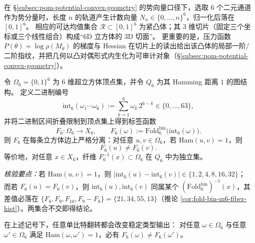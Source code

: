 \begin{enumerate}
  \begin{proposition}
  \label{prop:terminal-6d-reachable-mean-convex-body}
  在 \S\ref{subsec:pom-potential-convex-geometry} 的势向量口径下，选取 \(6\) 个二元通道作为势分量时，长度 \(n\) 的轨道产生计数向量
  \(N_n\in\{0,\dots,n\}^6\)，归一化后落在 \([0,1]^6\)。
  相应的可达均值集合 \(\mathcal{R}\subset[0,1]^6\) 为紧凸体；其 \(3\) 维切片（固定三个坐标或三个线性组合）构成“6D 立方体的 3D 切面”。
  更重要的是，压力函数 \(P(\theta)=\log\rho(M_\theta)\) 的梯度与 Hessian 在切片上的读出给出该凸体的局部一阶/二阶指纹，并把几何以凸对偶形式内生化为可审计对象（\S\ref{subsec:pom-potential-convex-geometry}）。
  \end{proposition}

  \begin{theorem}\label{thm:terminal-foldbin6-cube-edge-separation}
  令 \(\Omega_6=\{0,1\}^6\) 为 \(6\) 维超立方体顶点集，并令 \(Q_6\) 为其 Hamming 距离 \(1\) 的图结构。
  定义二进制编号
  \[
  \mathrm{int}_6(\omega_1\cdots\omega_6):=\sum_{k=1}^6 \omega_k\,2^{6-k}\in\{0,\dots,63\},
  \]
  并将二进制区间折叠限制到顶点集上得到标签函数
  \[
  F_6:\Omega_6\to X_6,\qquad F_6(\omega):=\mathrm{Fold}^{\mathrm{bin}}_6\bigl(\mathrm{int}_6(\omega)\bigr).
  \]
  则 \(F_6\) 在每条立方体边上严格分离：对任意 \(u,v\in\Omega_6\)，若 \(\mathrm{Ham}(u,v)=1\)，则
  \[
  F_6(u)\neq F_6(v).
  \]
  等价地，对任意 \(x\in X_6\)，纤维 \(F_6^{-1}(x)\subset\Omega_6\) 在 \(Q_6\) 中为独立集。
  \end{theorem}
  \emph{核验要点：}若 \(\mathrm{Ham}(u,v)=1\)，则 \(|\mathrm{int}_6(u)-\mathrm{int}_6(v)|\in\{1,2,4,8,16,32\}\)；
  而若 \(F_6(u)=F_6(v)\)，则 \(\mathrm{int}_6(u),\mathrm{int}_6(v)\) 同属某个 \((\mathrm{Fold}^{\mathrm{bin}}_6)^{-1}(x)\)，其差值必落在
  \(\{F_8,F_9,F_{10},F_9-F_8\}=\{21,34,55,13\}\)（推论 \ref{cor:fold-bin-m6-fiber-hist}）。两集合不交即得结论。

  \begin{corollary}\label{cor:terminal-foldbin6-onebit-error-detecting}
  在上述记号下，任意单比特翻转都会改变稳定类型输出：
  对任意 \(\omega\in\Omega_6\) 与任意 \(\omega'\in\Omega_6\) 满足 \(\mathrm{Ham}(\omega,\omega')=1\)，必有
  \(F_6(\omega)\neq F_6(\omega')\)。
  \end{corollary}


\end{enumerate}
